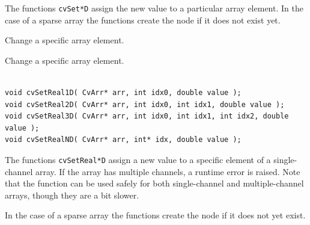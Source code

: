 \begin{description}
\end{description}

The functions \texttt{cvSet*D} assign the new value to a particular array element. In the case of a sparse array the functions create the node if it does not exist yet.

\ifplastex
{} 
 
 
 Change a specific array element.

\else
{}\label{SetReal*D}

Change a specific array element.

\begin{lstlisting}

void cvSetReal1D( CvArr* arr, int idx0, double value );
void cvSetReal2D( CvArr* arr, int idx0, int idx1, double value );
void cvSetReal3D( CvArr* arr, int idx0, int idx1, int idx2, double value );
void cvSetRealND( CvArr* arr, int* idx, double value );

\end{lstlisting}
\fi

\begin{description}
\end{description}

The functions \texttt{cvSetReal*D} assign a new value to a specific
element of a single-channel array. If the array has multiple channels,
a runtime error is raised. Note that the  function can be used
safely for both single-channel and multiple-channel arrays, though they
are a bit slower.

In the case of a sparse array the functions create the node if it does not yet exist.

